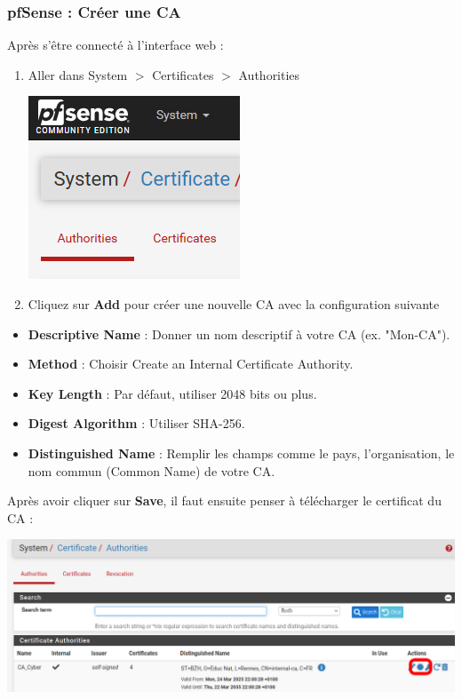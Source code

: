 \documentclass[french, 12pt]{article}%
\newcommand{\itemE}{\item[$\bullet$]}
\begin{document}
\subsubsection{pfSense : Créer une CA}
Après s'être connecté à l'interface web : 

\begin{enumerate}
\item Aller dans System $>$ Certificates $>$ Authorities
\begin{center}
\includegraphics[scale=0.7]{./ressource/caPfsense}
\end{center}

\item Cliquez sur \textbf{Add} pour créer une nouvelle CA avec la configuration suivante

\end{enumerate}
\begin{itemize}
\itemE \textbf{Descriptive Name} : Donner un nom descriptif à votre CA (ex. "Mon-CA").
\itemE \textbf{Method} : Choisir Create an Internal Certificate Authority.
\itemE \textbf{Key Length} : Par défaut, utiliser 2048 bits ou plus.
\itemE \textbf{Digest Algorithm} : Utiliser SHA-256.
\itemE \textbf{Distinguished Name} : Remplir les champs comme le pays, l'organisation, le nom commun (Common Name) de votre CA.

\end{itemize}



Après avoir cliquer sur \textbf{Save}, il faut ensuite penser à télécharger le certificat du CA : 

\begin{center}
\includegraphics[scale=0.5]{./ressource/ca_telecharger}
\end{center}
\end{document}
